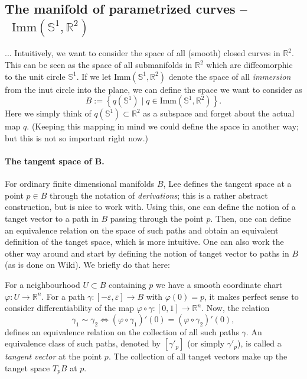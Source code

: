 \message{ !name(tangent_space_of_curves.tex)}\documentclass[a4,danish]{article}
\theoremstyle{break}
\theoremstyle{definition}
\theoremstyle{Break}
\newcommand{\R}{\mathbb{R}}
\newcommand*\I{\mathop{}\!\mathrm{Imm}}
\renewcommand{\S}{\mathbb{S}}
\renewcommand{\phi}{\varphi}
\renewcommand{\epsilon}{\varepsilon}
\begin{document}
\subsection*{The manifold of parametrized curves -- $\I(\S^1, \R^2)$}
\label{sec:parametrized-curves}


...
Intuitively, we want to consider the space of all (smooth) closed
curves in $\R^2$. This can be seen as the space of all submanifolds in
$\R^2$ which are diffeomorphic to the unit circle $\S^1$. If we let
$\text{Imm}(\S^1,\R^2)$ denote the space of all \textit{immersion}
from the inut circle into the plane, we can define the space we
want to consider as
\begin{equation}
  \label{eq:curves}
  B :=
  \left\{
    q(\S^1) \mid q \in \text{Imm}(\S^1,\R^2)
  \right\}.
\end{equation}
Here we simply think of $q(\S^1) \subset \R^2$ as a subspace and forget
about the actual map $q$. (Keeping this mapping in mind we could
define the space in another way; but this is not so important right
now.)

\paragraph{The tangent space of B.}
For ordinary finite dimensional manifolds $B$, Lee defines the tangent
space at a point $p \in B$ through the notation of
\textit{derivations}; this is a rather abstract construction, but is
nice to work with. Using this, one can define the notion of a
tanget vector to a path in $B$ passing through the point $p$. Then,
one can define an equivalence relation on the space of such paths and
obtain an equivalent definition of the tanget space, which is more
intuitive. One can also work the other way around and start by
defining the notion of tanget vector to paths in $B$ (as is done on
Wiki). We briefly do that here:

For a neighbourhood $U \subset B$ containing $p$ we have a smooth coordinate
chart $\phi\colon U \rightarrow \R^n$. For a path $\gamma \colon
[-\epsilon,\epsilon] \rightarrow B$ with $\phi(0) = p$, it makes perfect sense to consider
differentiability of the map $\phi \circ \gamma \colon
[0,1]\rightarrow \R^n$. Now, the relation
\begin{equation*}
  \gamma_1 \sim \gamma_2 \iff
  (\phi \circ \gamma_1)'(0) = (\phi \circ \gamma_2)'(0),
\end{equation*}
defines an equivalence relation on the collection of all such paths
$\gamma$. An equivalence class of such paths, denoted by $[\gamma'_p]$ (or simply
$\gamma'_p$), is called a \textit{tangent vector}
at the point $p$. The collection of all tanget vectors make up the
tanget space $T_pB$ at $p$.
\end{document}
